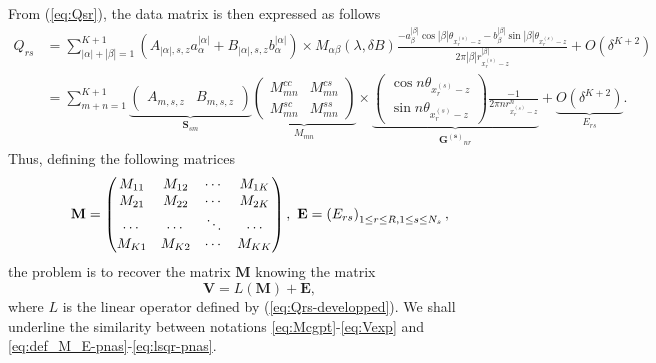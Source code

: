 From (\ref{eq:Qsr}), the data matrix is then expressed as follows
\begin{equation}
\begin{alignedat}{1}Q_{rs} & =\sum_{\left|\alpha\right|+\left|\beta\right|=1}^{K+1}
\left(A_{\left|\alpha\right|,s,z}a_{\alpha}^{\left|\alpha\right|}
+B_{\left|\alpha\right|,s,z}b_{\alpha}^{\left|\alpha\right|}\right) \times M_{\alpha\beta}(\lambda, \delta B)
\frac{-a_{\beta}^{\left|\beta\right|}\cos\left|\beta\right|\theta_{x_{r}^{(s)}-z}
-b_{\beta}^{\left|\beta\right|}\sin\left|\beta\right|\theta_{x_{r}^{(s)}-z}}{2\pi
\left|\beta\right|r_{x_{r}^{(s)}-z}^{\left|\beta\right|}} +O(\delta^{K+2})\\
 & =\sum_{m+n=1}^{K+1}\underbrace{\left(\begin{array}{cc}
A_{m,s,z} & B_{m,s,z}\end{array}\right)}_{\mathbf{S}_{sm}}\underbrace{\left(\begin{array}{cc}
M_{mn}^{cc} & M_{mn}^{cs}\\
M_{mn}^{sc} & M_{mn}^{ss}
\end{array}\right)}_{M_{mn}} \times \underbrace{\left(\begin{array}{c}
\cos n\theta_{x_{r}^{(s)}-z}\\
\sin n\theta_{x_{r}^{(s)}-z}
\end{array}\right)\frac{-1}{2\pi nr_{x_{r}^{(s)}-z}^{n}}}_{\mathbf{G^{(s)}}_{nr}}
+\underbrace{O(\delta^{K+2})}_{{E}_{rs}}.
\end{alignedat}
\label{eq:Qrs-developped}
\end{equation}
Thus, defining the following matrices
\begin{equation}
\mathbf{M} = \begin{pmatrix}
M_{11} & M_{12} & \cdots & M_{1K}\\
M_{21} & M_{22} & \cdots & M_{2K}\\
\cdots & \cdots & \ddots & \cdots\\
M_{K1} & M_{K2} & \cdots & M_{KK}
\end{pmatrix},\,\,\mathbf{E}=\left({E}_{rs}\right)_{1\leq r\leq R,1\leq s\leq N_s},
\label{eq:def_M_E-pnas}
\end{equation}
the problem is to recover the matrix $\mathbf{M}$ knowing the matrix
\begin{equation}
\mathbf{V}=L(\mathbf{M})+\mathbf{E},
\label{eq:lsqr-pnas}
\end{equation}
where $L$ is the linear operator defined by
(\ref{eq:Qrs-developped}). We shall underline the similarity between notations
\eqref{eq:Mcgpt}-\eqref{eq:Vexp} and \eqref{eq:def_M_E-pnas}-\eqref{eq:lsqr-pnas}.

